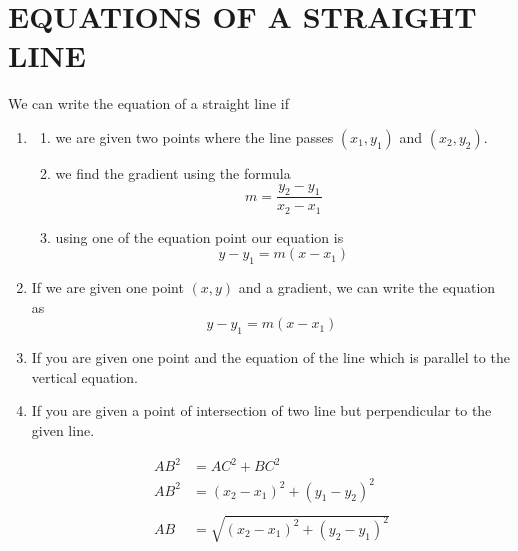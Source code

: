 \documentclass[11pt,a4paper]{article}
\begin{document}
\pagebreak
\section{EQUATIONS OF A STRAIGHT LINE}

We can write the equation of a straight line if 

\begin{enumerate}
\item 
\begin{enumerate}
      \item[i.] we are given two points where the line passes $(x_1,y_1)$ and $(x_2,y_2)$.
      
      \item[ii.] we find the gradient using the formula $$m = \dfrac{y_2 - y_1}{x_2 - x_1}$$
      
      \item[iii.] using one of the equation point our equation is $$ y - y_1 = m(x - x_1)$$
\end{enumerate}



\item If we are given one point $(x,y)$ and a gradient, we can write the equation as $$y- y_1 = m(x - x_1)$$

\item If you are given one point and the equation of the line which is parallel to the vertical equation.

\item If you are given a point of intersection of two line but perpendicular to the given line.

\begin{figure}[H]
\centering
{}
\end{figure}















\begin{align*}
AB^2 & = AC^2 + BC^2\\
AB^2 & = (x_2 - x_1)^2 + (y_1  - y_2)^2\\\\
AB & = \sqrt{(x_2 - x_1)^2 + (y_2 - y_1)^2}
\end{align*}
\end{enumerate}
\end{document}
